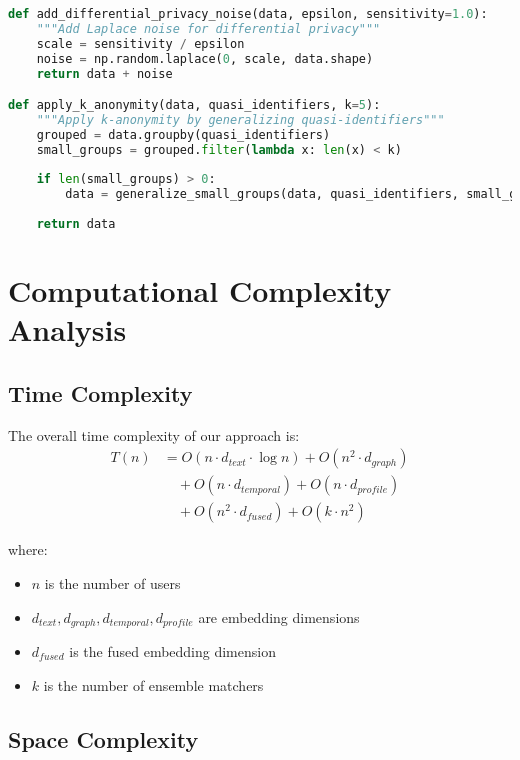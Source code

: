 \documentclass[conference]{IEEEtran}
\begin{document}
\begin{lstlisting}[language=Python, caption=Differential Privacy Implementation]
def add_differential_privacy_noise(data, epsilon, sensitivity=1.0):
    """Add Laplace noise for differential privacy"""
    scale = sensitivity / epsilon
    noise = np.random.laplace(0, scale, data.shape)
    return data + noise

def apply_k_anonymity(data, quasi_identifiers, k=5):
    """Apply k-anonymity by generalizing quasi-identifiers"""
    grouped = data.groupby(quasi_identifiers)
    small_groups = grouped.filter(lambda x: len(x) < k)
    
    if len(small_groups) > 0:
        data = generalize_small_groups(data, quasi_identifiers, small_groups)
    
    return data
\end{lstlisting}

\section{Computational Complexity Analysis}

\subsection{Time Complexity}

The overall time complexity of our approach is:
\begin{align}
T(n) &= O(n \cdot d_{text} \cdot \log n) + O(n^2 \cdot d_{graph}) \\
&\quad + O(n \cdot d_{temporal}) + O(n \cdot d_{profile}) \\
&\quad + O(n^2 \cdot d_{fused}) + O(k \cdot n^2)
\end{align}

where:
\begin{itemize}
\item $n$ is the number of users
\item $d_{text}, d_{graph}, d_{temporal}, d_{profile}$ are embedding dimensions
\item $d_{fused}$ is the fused embedding dimension
\item $k$ is the number of ensemble matchers
\end{itemize}

\subsection{Space Complexity}
\end{document}
